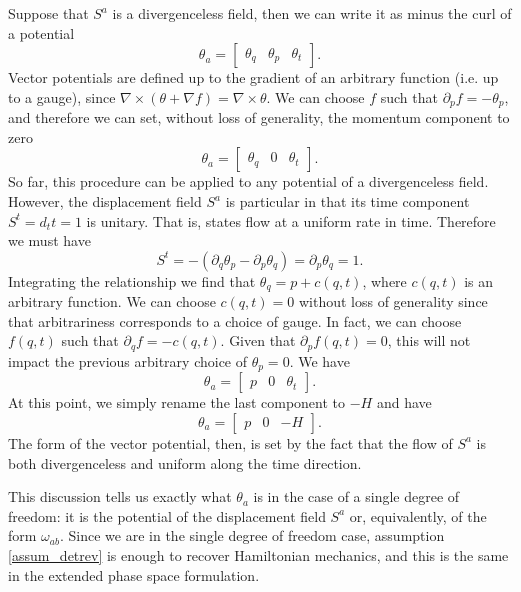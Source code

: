 Suppose that $S^a$ is a divergenceless field, then we can write it as minus the curl of a potential
\begin{equation}
	\theta_a = \begin{bmatrix}
	\theta_q & \theta_p & \theta_t
\end{bmatrix} .
\end{equation}
Vector potentials are defined up to the gradient of an arbitrary function (i.e. up to a gauge), since $\nabla \times (\theta + \nabla f) = \nabla \times \theta$. We can choose $f$ such that $\partial_p f = - \theta_p$, and therefore we can set, without loss of generality, the momentum component to zero
\begin{equation}
	\theta_a = \begin{bmatrix}
		\theta_q & 0 & \theta_t
	\end{bmatrix} .
\end{equation}
So far, this procedure can be applied to any potential of a divergenceless field. However, the displacement field $S^a$ is particular in that its time component $S^t = d_t t = 1$ is unitary. That is, states flow at a uniform rate in time. Therefore we must have
\begin{equation}
	S^t = - (\partial_q \theta_p - \partial_p \theta_q) = \partial_p \theta_q = 1.
\end{equation}
Integrating the relationship we find that $\theta_q = p + c(q, t)$, where $c(q,t)$ is an arbitrary function. We can choose $c(q,t) = 0$ without loss of generality since that arbitrariness corresponds to a choice of gauge. In fact, we can choose $f(q,t)$ such that $\partial_q f = - c(q,t)$. Given that $\partial_p f(q,t)=0$, this will not impact the previous arbitrary choice of $\theta_p = 0$. We have
\begin{equation}
	\theta_a = \begin{bmatrix}
		p & 0 & \theta_t
	\end{bmatrix}.
\end{equation}
At this point, we simply rename the last component to $-H$ and have
\begin{equation}
	\theta_a = \begin{bmatrix}
		p & 0 & -H
	\end{bmatrix}.
\end{equation}
The form of the vector potential, then, is set by the fact that the flow of $S^a$ is both divergenceless and uniform along the time direction.

This discussion tells us exactly what $\theta_a$ is in the case of a single degree of freedom: it is the potential of the displacement field $S^a$ or, equivalently, of the form $\omega_{ab}$. Since we are in the single degree of freedom case, assumption \ref{assum_detrev} is enough to recover Hamiltonian mechanics, and this is the same in the extended phase space formulation.

